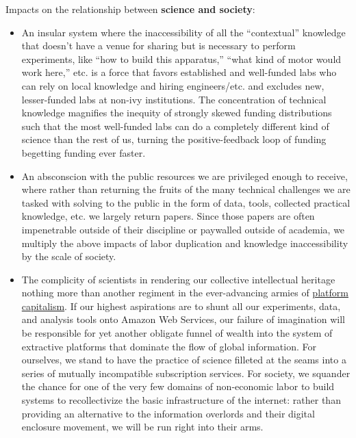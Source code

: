 Impacts on the relationship between \textbf{science and society}:

\begin{itemize}

\item
  An insular system where the inaccessibility of all the ``contextual''
  knowledge \citep{woolKnowledgeNetworksHow2020, barleyBackroomsScienceWork1994}  that doesn't have a venue for
  sharing but is necessary to perform experiments, like ``how to build
  this apparatus,'' ``what kind of motor would work here,'' etc. is a
  force that favors established and well-funded labs who can rely on
  local knowledge and hiring engineers/etc. and excludes new,
  lesser-funded labs at non-ivy institutions. The concentration of
  technical knowledge magnifies the inequity of strongly skewed funding
  distributions such that the most well-funded labs can do a completely
  different kind of science than the rest of us, turning the
  positive-feedback loop of funding begetting funding ever faster.
\item
  An absconscion with the public resources we are privileged enough to
  receive, where rather than returning the fruits of the many technical
  challenges we are tasked with solving to the public in the form of
  data, tools, collected practical knowledge, etc. we largely return
  papers. Since those papers are often impenetrable outside of their
  discipline or paywalled outside of academia, we multiply the above
  impacts of labor duplication and knowledge inaccessibility by the
  scale of society.
\item
  The complicity of scientists in rendering our collective intellectual
  heritage nothing more than another regiment in the ever-advancing
  armies of
  \protect\hyperlink{platforms-industry-capture-and-the-profit-motive}{platform
  capitalism}. If our highest aspirations are to shunt all our
  experiments, data, and analysis tools onto Amazon Web Services, our
  failure of imagination will be responsible for yet another obligate
  funnel of wealth into the system of extractive platforms that dominate
  the flow of global information. For ourselves, we stand to have the
  practice of science filleted at the seams into a series of mutually
  incompatible subscription services. For society, we squander the
  chance for one of the very few domains of non-economic labor to build
  systems to recollectivize the basic infrastructure of the internet:
  rather than providing an alternative to the information overlords and
  their digital enclosure movement, we will be run right into their
  arms.
\end{itemize}

